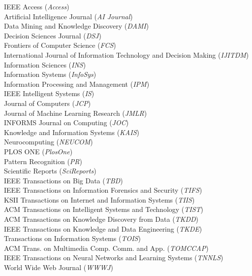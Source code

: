 \documentclass[10pt]{article}
\newenvironment{myindentpar}[1]%
{\begin{list}{}%
         {\setlength{\leftmargin}{#1}}%
         \item[]%
}
{\end{list}}
\newcounter{list}
\begin{document}
\begin{myindentpar}{0.75cm}
\hspace{-0.75cm}{\bf Journal Reviewer}

{\small

IEEE Access (\textit{Access}) \\
Artificial Intelligence Journal (\textit{AI Journal}) \\
Data Mining and Knowledge Discovery (\textit{DAMI}) \\
Decision Sciences Journal (\textit{DSJ}) \\
Frontiers of Computer Science (\textit{FCS}) \\
International Journal of Information Technology and Decision Making (\textit{IJITDM}) \\
Information Sciences (\textit{INS}) \\
Information Systems (\textit{InfoSys}) \\
Information Processing and Management (\textit{IPM}) \\
IEEE Intelligent Systems (\textit{IS}) \\
Journal of Computers (\textit{JCP}) \\
Journal of Machine Learning Research (\textit{JMLR}) \\
INFORMS Journal on Computing (\textit{JOC}) \\
Knowledge and Information Systems (\textit{KAIS}) \\
Neurocomputing (\textit{NEUCOM}) \\
PLOS ONE (\textit{PlosOne}) \\
Pattern Recognition (\textit{PR}) \\
Scientific Reports (\textit{SciReports}) \\
IEEE Transactions on Big Data (\textit{TBD}) \\
IEEE Transactions on Information Forensics and Security (\textit{TIFS}) \\
KSII Transactions on Internet and Information Systems (\textit{TIIS}) \\
ACM Transactions on Intelligent Systems and Technology (\textit{TIST}) \\
ACM Transactions on Knowledge Discovery from Data (\textit{TKDD}) \\
IEEE Transactions on Knowledge and Data Engineering (\textit{TKDE}) \\
Transactions on Information Systems (\textit{TOIS}) \\
ACM Trans. on Multimedia Comp. Comm. and App. (\textit{TOMCCAP}) \\
IEEE Transactions on Neural Networks and Learning Systems (\textit{TNNLS}) \\
World Wide Web Journal (\textit{WWWJ})

}

\end{myindentpar}
\end{document}
